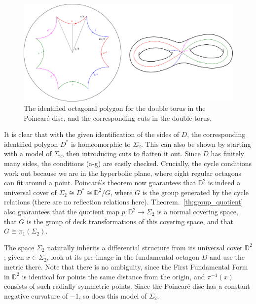 \documentclass[12pt]{article}
\theoremstyle{definition}
\theoremstyle{remark}
\begin{document}
    \begin{figure}[H]
        \begin{center}
            \includegraphics[width=1.0\textwidth]{figures/double_torus.png}
        \end{center}
        \caption{The identified octagonal polygon for the double torus in the
        Poincar\'e disc, and the corresponding cuts in the double torus.}
        \label{fig:double_torus}
    \end{figure}


    It is clear that with the given identification of the sides of $D$, the
    corresponding identified polygon $D^*$ is homeomorphic to $\Sigma_2$. This can
    also be shown by starting with a model of $\Sigma_2$, then introducing cuts to
    flatten it out. Since $D$ has finitely many sides, the conditions (a-g) are
    easily checked. Crucially, the cycle conditions work out because we are in the
    hyperbolic plane, where eight regular octagons can fit around a point.
    Poincar\'e's theorem now guarantees that $\mathbb{D}^2$ is indeed a universal
    cover of $\Sigma_2 \cong D^* \cong \mathbb{D}^2 / G$, where $G$ is the group
    generated by the cycle relations (there are no reflection relations here).
    Theorem.~\ref{th:group_quotient} also guarantees that the quotient map $p\colon
    \mathbb{D}^2 \to \Sigma_2$ is a normal covering space, that $G$ is the group of
    deck transformations of this covering space, and that $G \cong \pi_1(\Sigma_2)$.

    The space $\Sigma_2$ naturally inherits a differential structure from its
    universal cover $\mathbb{D}^2$; given $x \in \Sigma_2$, look at its pre-image in
    the fundamental octagon $\overline{D}$ and use the metric there. Note that there
    is no ambiguity, since the First Fundamental Form in $\mathbb{D}^2$ is identical
    for points the same distance from the origin, and $\pi^{-1}(x)$ consists of such
    radially symmetric points. Since the Poincar\'e disc has a constant negative
    curvature of $-1$, so does this model of $\Sigma_2$.
\end{document}
